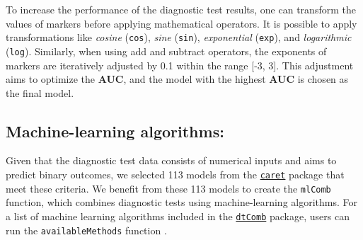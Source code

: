 \documentclass[10pt]{article}
\newcommand{\CRANpkg}[1]{\href{https://cran.r-project.org/web/packages/#1/index.html}{\texttt{#1}}}
\newcommand{\Rfunction}[1]{\texttt{#1}}
\begin{document}
To increase the performance of the diagnostic test results, one can transform the values of markers before applying mathematical operators. It is possible to apply transformations like \emph{cosine} (\texttt{cos}), \emph{sine} (\texttt{sin}), \emph{exponential} (\texttt{exp}), and \emph{logarithmic} (\texttt{log}). Similarly, when using add and subtract operators, the exponents of markers are iteratively adjusted by 0.1 within the range [-3, 3]. This adjustment aims to optimize the \textbf{AUC}, and the model with the highest \textbf{AUC} is chosen as the final model.
\subsection{Machine-learning algorithms:}
Given that the diagnostic test data consists of numerical inputs and aims to predict binary outcomes, we selected 113 models from the \CRANpkg{caret} package that meet these criteria. We benefit from these 113 models to create the \Rfunction{mlComb} function, which combines diagnostic tests using machine-learning algorithms. For a list of machine learning algorithms included in the \CRANpkg{dtComb} package, users can run the \Rfunction{availableMethods} function \citep{kuhn2008building}.
\end{document}
